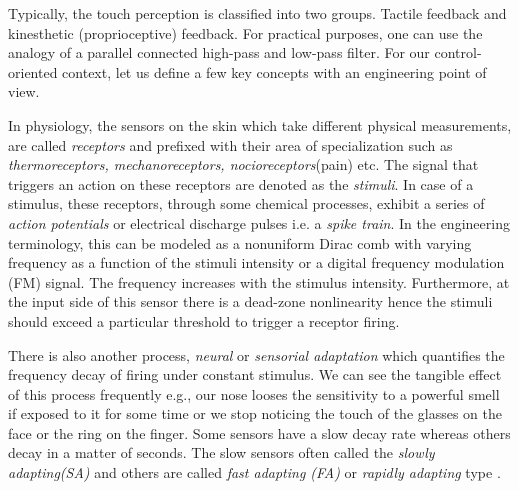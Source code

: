 Typically, the touch perception is classified into two groups. Tactile feedback and kinesthetic (proprioceptive) feedback. For practical purposes, one can use the analogy of a parallel connected high-pass and low-pass filter. For our control-oriented context, let us define a few key concepts with an engineering point of view. 

In physiology, the sensors on the skin which take different physical measurements, are called \emph{receptors} and prefixed with their area of specialization such as \emph{thermoreceptors, mechanoreceptors, nocioreceptors}(pain) etc. The signal that triggers an action on these receptors are denoted as the \emph{stimuli}. In case of a stimulus, these receptors, through some chemical processes, exhibit a series of \emph{action potentials} or electrical discharge pulses i.e. a \emph{spike train}. In the engineering terminology, this can be modeled as a nonuniform Dirac comb with varying frequency as a function of the stimuli intensity or a digital frequency modulation (FM) signal. The frequency increases with the stimulus intensity. Furthermore, at the input side of this sensor there is a dead-zone nonlinearity hence the stimuli should exceed a particular threshold to trigger a receptor firing.

There is also another process, \emph{neural} or \emph{sensorial adaptation} which quantifies the frequency decay of firing under constant stimulus. We can see the tangible effect of this process frequently e.g., our nose looses the sensitivity to a powerful smell if exposed to it for some time or we stop noticing the touch of the glasses on the face or the ring on the finger. Some sensors have a slow decay rate whereas others decay in a matter of seconds. The slow sensors often called the \emph{slowly adapting(SA)} and others are called \emph{fast adapting (FA)} or \emph{rapidly adapting} type \cite{burdea}.



